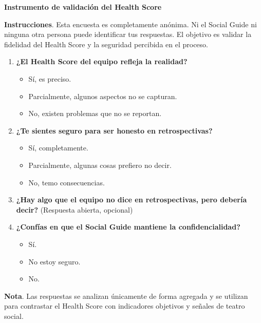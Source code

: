 \begin{protocolo}
    \textbf{Instrumento de validación del Health Score}

    \textbf{Instrucciones}. Esta encuesta es completamente anónima.
    Ni el Social Guide ni ninguna otra persona puede identificar tus respuestas.
    El objetivo es validar la fidelidad del Health Score y la seguridad percibida en el proceso.

    \begin{enumerate}
        \item \textbf{¿El Health Score del equipo refleja la realidad?}
              \begin{itemize}
                  \item Sí, es preciso.
                  \item Parcialmente, algunos aspectos no se capturan.
                  \item No, existen problemas que no se reportan.
              \end{itemize}

        \item \textbf{¿Te sientes seguro para ser honesto en retrospectivas?}
              \begin{itemize}
                  \item Sí, completamente.
                  \item Parcialmente, algunas cosas prefiero no decir.
                  \item No, temo consecuencias.
              \end{itemize}

        \item \textbf{¿Hay algo que el equipo no dice en retrospectivas, pero debería decir?}
              (Respuesta abierta, opcional)

        \item \textbf{¿Confías en que el Social Guide mantiene la confidencialidad?}
              \begin{itemize}
                  \item Sí.
                  \item No estoy seguro.
                  \item No.
              \end{itemize}
    \end{enumerate}

    \textbf{Nota}. Las respuestas se analizan únicamente de forma agregada y se utilizan
    para contrastar el Health Score con indicadores objetivos y señales de teatro social.
\end{protocolo}

